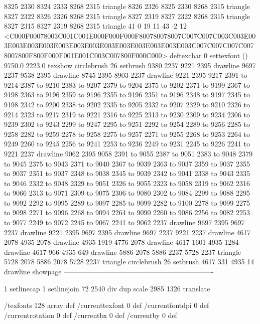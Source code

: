 8325 2330 8324 2333 8268 2315 triangle
8326 2326 8325 2330 8268 2315 triangle
8327 2322 8326 2326 8268 2315 triangle
8327 2319 8327 2322 8268 2315 triangle
8327 2315 8327 2319 8268 2315 triangle
41 0 19 11 43 -2 12 {{<C000F00078003C001C001E000F000F000F800780078007C007C007C003C003E003E003E003E003E003E003E003E003E003E003E003E003E003C007C007C007C0078007800F800F000F001E001C003C007800F000C000>}} deftexchar
0 settexfont
() 9750.0 2223.0 texshow
circlebrush 26 setbrush
9380 2237 9221 2395 drawline
9697 2237 9538 2395 drawline
8745 2395 8903 2237 drawline
9221 2395 9217 2391 to 9214 2387 to 9210 2383 to 9207 2379 to 9204 2375 to 9202 2371 to 9199 2367 to 9198 2363 to 9196 2359 to 9196 2355 to 9196 2351 to 9196 2348 to 9197 2345 to 9198 2342 to 9200 2338 to 9202 2335 to 9205 2332 to 9207 2329 to 9210 2326 to 9214 2323 to 9217 2319 to 9221 2316 to 9225 2313 to 9230 2309 to 9234 2306 to 9239 2302 to 9243 2299 to 9247 2295 to 9251 2292 to 9254 2289 to 9256 2285 to 9258 2282 to 9259 2278 to 9258 2275 to 9257 2271 to 9255 2268 to 9253 2264 to 9249 2260 to 9245 2256 to 9241 2253 to 9236 2249 to 9231 2245 to 9226 2241 to 9221 2237 drawline
9062 2395 9058 2391 to 9055 2387 to 9051 2383 to 9048 2379 to 9045 2375 to 9043 2371 to 9040 2367 to 9039 2363 to 9037 2359 to 9037 2355 to 9037 2351 to 9037 2348 to 9038 2345 to 9039 2342 to 9041 2338 to 9043 2335 to 9046 2332 to 9048 2329 to 9051 2326 to 9055 2323 to 9058 2319 to 9062 2316 to 9066 2313 to 9071 2309 to 9075 2306 to 9080 2302 to 9084 2299 to 9088 2295 to 9092 2292 to 9095 2289 to 9097 2285 to 9099 2282 to 9100 2278 to 9099 2275 to 9098 2271 to 9096 2268 to 9094 2264 to 9090 2260 to 9086 2256 to 9082 2253 to 9077 2249 to 9072 2245 to 9067 2241 to 9062 2237 drawline
9697 2395 9697 2237 drawline
9221 2395 9697 2395 drawline
9697 2237 9221 2237 drawline
4617 2078 4935 2078 drawline
4935 1919 4776 2078 drawline
4617 1601 4935 1284 drawline
4617 966 4935 649 drawline
5886 2078 5886 2237 5728 2237 triangle
5728 2078 5886 2078 5728 2237 triangle
circlebrush 26 setbrush
4617 331 4935 14 drawline
showpage
----------------------------------------------------------------

1 setlinecap 1 setlinejoin
72 2540 div dup scale
2985 1326 translate



/texfonts 128 array def
/currenttexfont 0 def
/currentfontdpi 0 def
/currentrotation 0 def
/currentbx 0 def
/currentby 0 def

